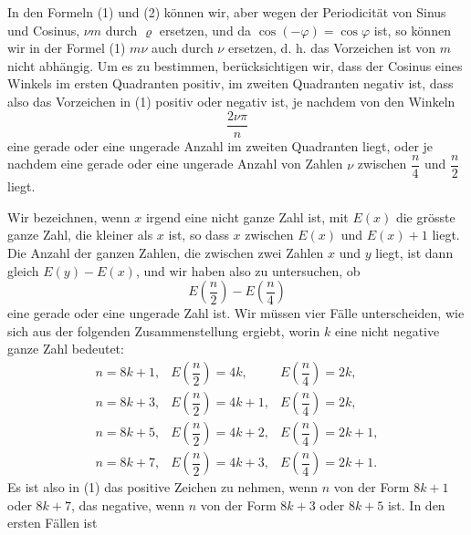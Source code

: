 
In den Formeln (1) und (2) können wir, aber wegen der Periodicität von Sinus und Cosinus, $\nu m$ durch $\varrho$ ersetzen, und da $\cos(-\varphi) = \cos\varphi$ ist, so können wir in der Formel (1) $m\nu$ auch durch $\nu$ ersetzen, d. h. das Vorzeichen ist von $m$ nicht abhängig. Um es zu bestimmen, berücksichtigen wir, dass der Cosinus eines Winkels im ersten Quadranten positiv, im zweiten Quadranten negativ ist, dass also das Vorzeichen in (1) positiv oder negativ ist, je nachdem von den Winkeln
\[
\frac{2\nu\pi}{n}
\]
eine gerade oder eine ungerade Anzahl im zweiten Quadranten liegt, oder je nachdem eine gerade oder eine ungerade Anzahl von Zahlen $\nu$ zwischen $\dfrac{n}{4}$ und $\dfrac{n}{2}$ liegt.

Wir bezeichnen, wenn $x$ irgend eine nicht ganze Zahl ist, mit $E(x)$ die grösste ganze Zahl, die kleiner als $x$ ist, so dass $x$ zwischen $E(x)$ und $E(x)+1$ liegt. Die Anzahl der ganzen Zahlen, die zwischen zwei Zahlen $x$ und $y$ liegt, ist dann gleich $E(y) - E(x)$, und wir haben also zu untersuchen, ob
\[
E\left(\frac{n}{2}\right) - E\left(\frac{n}{4}\right)
\]
eine gerade oder eine ungerade Zahl ist. Wir müssen vier Fälle unterscheiden, wie sich aus der folgenden Zusammenstellung ergiebt, worin $k$ eine nicht negative ganze Zahl bedeutet:
\[
\begin{array}{lll}
n = 8k+1, & E\left(\dfrac{n}{2}\right) = 4k, & E\left(\dfrac{n}{4}\right) = 2k, \\[2ex]
n = 8k+3, & E\left(\dfrac{n}{2}\right) = 4k+1, & E\left(\dfrac{n}{4}\right) = 2k, \\[2ex]
n = 8k+5, & E\left(\dfrac{n}{2}\right) = 4k+2, & E\left(\dfrac{n}{4}\right) = 2k+1, \\[2ex]
n = 8k+7, & E\left(\dfrac{n}{2}\right) = 4k+3, & E\left(\dfrac{n}{4}\right) = 2k+1.
\end{array}
\]
Es ist also in (1) das positive Zeichen zu nehmen, wenn $n$ von der Form $8k+1$ oder $8k+7$, das negative, wenn $n$ von der Form $8k+3$ oder $8k+5$ ist. In den ersten Fällen ist
